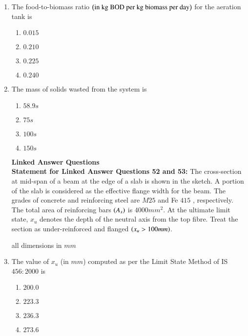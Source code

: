 \documentclass[journal]{IEEEtran}
\begin{document}
\begin{enumerate}
	\item  The food-to-biomass  ratio $\left(\text{in kg BOD per kg biomass per day}\right)$ for the aeration tank is
		\begin{enumerate}
			\item $0.015$
			\item $0.210$
			\item $0.225$
			\item $0.240$
        	\end{enumerate}	
	\item The mass  of solids wasted from the system is
		\begin{enumerate}
			\item $58.9 s$
			\item $75 s$
			\item $100 s$
			\item $150 s$
        	\end{enumerate}	
\textbf{Linked Answer Questions}\\
\textbf{Statement for Linked Answer Questions 52 and 53:}
	The cross-section at mid-span of a beam at the edge of a slab is shown in the sketch. A portion of the slab is considered as the effective flange width for the beam. The grades of concrete and reinforcing steel are $M25$ and Fe $415$ , respectively. The total area of reinforcing bars $\left(A_{s}\right)$ is $4000 mm^{2}$. At the ultimate limit state, $x_{u}$ denotes the depth of the neutral axis from the top fibre. Treat the section as under-reinforced and flanged $\left(x_{u}>100 mm\right)$.

 
 all dimensions in $mm$
       \item The value of $x_{u}$ (in $mm$) computed as per the Limit State Method of IS $456:2000$ is
		\begin{enumerate}
			\item $200.0$
			\item $223.3$
			\item $236.3$
			\item $273.6$
        	\end{enumerate}	
\end{enumerate}	
\end{document}

